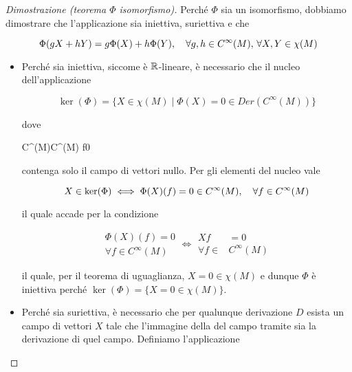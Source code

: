 \begin{proof}[Dimostrazione (teorema $ \Phi $ isomorfismo)]
	Perché $ \Phi $ sia un isomorfismo, dobbiamo dimostrare che l'applicazione sia iniettiva, suriettiva e che
	
	\begin{equation}
		\Phi(g X + h Y) = g \Phi(X) + h \Phi(Y) \qcomma \forall g,h \in C^{\infty}(M), \, \forall X,Y \in \chi(M)
	\end{equation}

\begin{itemize}
	\item Perché sia iniettiva, siccome è $ \mathbb{R} $-lineare, è necessario che il nucleo dell'applicazione
	
	\begin{equation}
		\ker(\Phi) = \{ X \in \chi(M) \mid \Phi(X) = 0 \in Der(C^{\infty}(M)) \}
	\end{equation}

	dove
	
		{C^{\infty}(M)}{C^{\infty}(M)}
		{f}{0}

	contenga solo il campo di vettori nullo. Per gli elementi del nucleo vale
	
	\begin{equation}
		X \in \ker(\Phi) \iff \Phi(X)(f) = 0 \in C^{\infty}(M) \qcomma \forall f \in C^{\infty}(M)
	\end{equation}

	il quale accade per la condizione
	
	\begin{equation}
		\begin{aligned}
			\Phi(X)(f) = 0 \\
			\forall f \in C^{\infty}(M)
		\end{aligned} %
		\iff %
		\begin{aligned}
			X f &= 0 \\
			\forall f \in &C^{\infty}(M)
		\end{aligned}
	\end{equation}

	il quale, per il teorema di uguaglianza, $ X = 0 \in \chi(M) $ e dunque $ \Phi $ è iniettiva perché $ \ker(\Phi) = \{ X = 0 \in \chi(M) \} $.
	
	\item Perché sia suriettiva, è necessario che per qualunque derivazione $ D $ esista un campo di vettori $ X $ tale che l'immagine della del campo tramite  sia la derivazione di quel campo. Definiamo l'applicazione
	

\end{itemize}
\end{proof}
